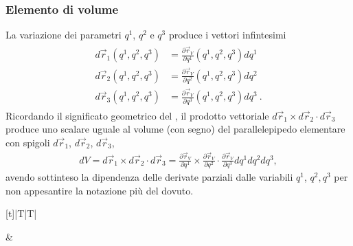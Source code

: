 \documentclass[letterpaper,10pt,italian]{jupyterBook}
\begin{document}
\subsubsection{Elemento di volume}
\label{\detokenize{ch/vector-calculus/geometry:elemento-di-volume}}\label{\detokenize{ch/vector-calculus/geometry:vector-calculus-geometry-volumes-infinitesimal}}
\sphinxAtStartPar
La variazione dei parametri \(q^1\), \(q^2\) e \(q^3\) produce i vettori infintesimi
\begin{equation*}
\begin{split}\begin{aligned}
  d \vec{r}_1 (q^1,q^2,q^3) & = \frac{\partial \vec{r}_V}{\partial q^1}(q^1, q^2, q^3) d q^1 \\
  d \vec{r}_2 (q^1,q^2,q^3) & = \frac{\partial \vec{r}_V}{\partial q^2}(q^1, q^2, q^3) d q^2 \\
  d \vec{r}_3 (q^1,q^2,q^3) & = \frac{\partial \vec{r}_V}{\partial q^3}(q^1, q^2, q^3) d q^3 \ .
\end{aligned}\end{split}
\end{equation*}
\sphinxAtStartPar
Ricordando il significato geometrico del , il prodotto vettoriale \(d \vec{r}_1 \times d \vec{r}_2 \cdot d \vec{r}_3\) produce uno scalare uguale al volume (con segno) del parallelepipedo elementare con spigoli \(d \vec{r}_1\), \(d \vec{r}_2\), \(d \vec{r}_3\),
\begin{equation*}
\begin{split}d V = d \vec{r}_1 \times d \vec{r}_2 \cdot d \vec{r}_3 = \frac{\partial \vec{r}_V}{\partial q^1} \times \frac{\partial \vec{r}_V}{\partial q^2} \cdot \frac{\partial \vec{r}_V}{\partial q^3} d q^1 d q^2 d q^3 , \end{split}
\end{equation*}
\sphinxAtStartPar
avendo sottinteso la dipendenza delle derivate parziali dalle variabili \(q^1\), \(q^2, q^3\) per non appesantire la notazione più del dovuto.


\begin{savenotes}\sphinxattablestart
\centering
\begin{tabulary}{\linewidth}[t]{|T|T|}
\hline

\sphinxAtStartPar
{}
&
\sphinxAtStartPar
{}
\\
\hline
\end{tabulary}
\par
\sphinxattableend\end{savenotes}
\end{document}
